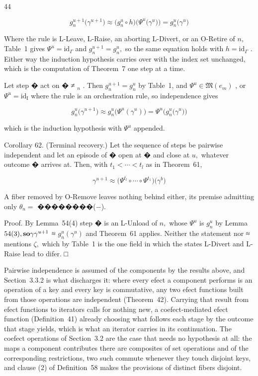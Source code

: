 \documentclass[
  10
]{article}
\begin{document}
44

\[
g _ { n } ^ { u + 1 } \big ( \gamma ^ { u + 1 } \big ) \approx \big ( g _ { n } ^ { u } \circ h \big ) \big ( \Psi ^ { u } \big ( \gamma ^ { u } \big ) \big ) = g _ { n } ^ { u } \big ( \gamma ^ { u } \big )
\]

Where the rule is L-Leave, L-Raise, an aborting L-Divert, or an O-Retire
of \(n ,\) Table~1 gives \(\Psi ^ { u } = \mathrm { i d } _ { \Gamma }\)
and \(g _ { n } ^ { u + 1 } = g _ { n } ^ { u } ,\) so the same equation
holds with \(h = \mathrm { i d } _ { \Gamma }\) . Either way the
induction hypothesis carries over with the index set unchanged, which is
the computation of Theorem~7 one step at a time.

Let step � act on � ≠ \(_ n\) . Then
\(g _ { n } ^ { u + 1 } = g _ { n } ^ { u }\) by Table~1, and
\(\Psi ^ { u } \in \mathfrak { M } ( e _ { m } )\) , or
\(\Psi ^ { u } = \mathrm { i d } _ { \mathrm { I } }\) where the rule is
an orchestration rule, so independence gives

\[
g _ { n } ^ { u } \bigl ( \gamma ^ { u + 1 } \bigr ) \approx g _ { n } ^ { u } \bigl ( \Psi ^ { u } ( \gamma ^ { u } ) \bigr ) = \Psi ^ { u } \bigl ( g _ { n } ^ { u } \bigl ( \gamma ^ { u } \bigr ) \bigr )
\]

which is the induction hypothesis with \(\Psi ^ { u }\) appended.

Corollary 62. (Terminal recovery.) Let the sequence of steps be pairwise
independent and let an episode of � open at � and close at \(u ,\)
whatever outcome � arrives at. Then, with
\(t _ { 1 } < \cdots < t _ { l }\) as in Theorem~61,

\[
\gamma ^ { u + 1 } \approx \bigl ( \Psi ^ { t _ { l } } \circ \cdots \circ \Psi ^ { t _ { 1 } } \bigr ) \bigl ( \gamma ^ { b } \bigr )\tag{57}
\]

A fiber removed by O-Remove leaves nothing behind either, its premise
admitting only \(\theta _ { n } =\) ��������(−).

Proof. By Lemma~54(4) step � is an L-Unload of \(n ,\) whose
\(\Psi ^ { u }\) is \(g _ { n } ^ { u }\) by Lemma
\(5 4 ( 3 ) , { \bf s o \gamma } \gamma ^ { u + 1 }\) ≈
\(g _ { n } ^ { u } ( \gamma ^ { u } )\) and Theorem~61 applies. Neither
the statement nor ≈ mentions \(\zeta ,\) which by Table~1 is the one
field in which the states L-Divert and L-Raise lead to difer. □

Pairwise independence is assumed of the components by the results above,
and Section~3.3.2 is what discharges it: where every efect a component
performs is an operation of a key and every key is commutative, any two
efect functions built from those operations are independent
(Theorem~42). Carrying that result from efect functions to iterators
calls for nothing new, a coefect-mediated efect function (Definition~41)
already choosing what follows each stage by the outcome that stage
yields, which is what an iterator carries in its continuation. The
coefect operations of Section~3.2 are the case that needs no hypothesis
at all: the maps a component contributes there are composites of set
operations and of the corresponding restrictions, two such commute
whenever they touch disjoint keys, and clause (2) of Definition~58 makes
the provisions of distinct fibers disjoint.
\end{document}

